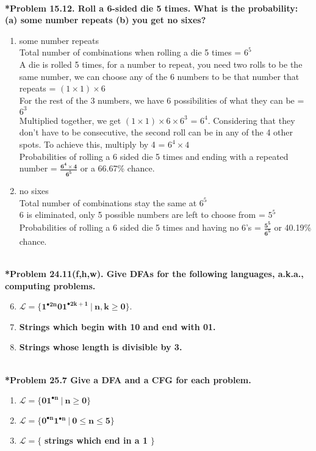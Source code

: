 \documentclass{article}
\begin{document}
    \noindent\\[0.25in]
    \noindent\textbf{*Problem 15.12. Roll a 6-sided die 5 times. What is the probability: (a) some number repeats (b) you get no sixes?}
    \begin{enumerate}[label=(\alph*)]
        \item some number repeats
        \\ Total number of combinations when rolling a die 5 times = $6^5$
        \\ A die is rolled 5 times, for a number to repeat, you need two rolls to be the same number, we can choose any of the 6 numbers to be that number that repeats = $(1\times1)\times6$
        \\ For the rest of the 3 numbers, we have 6 possibilities of what they can be = $6^3$
        \\ Multiplied together, we get $(1\times1)\times6\times6^3$ = $6^4$. Considering that they don't have to be consecutive, the second roll can be in any of the 4 other spots. To achieve this, multiply by 4 = $6^4 \times 4$
        \\ Probabilities of rolling a 6 sided die 5 times and ending with a repeated number = {\LARGE $\boxed{\mathbf{\frac{6^4 \times 4}{6^5}}}$} or a 66.67\% chance.
        \item no sixes
        \\ Total number of combinations stay the same at $6^5$
        \\ 6 is eliminated, only 5 possible numbers are left to choose from = $5^5$
        \\ Probabilities of rolling a 6 sided die 5 times and having no 6's = {\LARGE $\boxed{\mathbf{\frac{5^5}{6^5}}}$} or 40.19\% chance.
    \end{enumerate}

    \noindent\\[0.25in]
    \noindent\textbf{*Problem 24.11(f,h,w). Give DFAs for the following languages, a.k.a., computing problems.}
    \begin{enumerate}[label=(\alph*)]
        \setcounter{enumi}{5}
        \item $\mathbf{\mathcal{L}=\{1^{\bullet 2n}01^{\bullet 2k+1}\ |\ n,k\ge 0\}}$.
        \setcounter{enumi}{7}
        \item \textbf{Strings which begin with 10 and end with 01.}
        \setcounter{enumi}{22}
        \item \textbf{Strings whose length is divisible by 3.}
    \end{enumerate}

    \noindent\\[0.25in]
    \noindent\textbf{*Problem 25.7 Give a DFA and a CFG for each problem.}
    \begin{enumerate}[label=(\alph*)]
        \item $\mathbf{\mathcal{L}=\{01^{\bullet n}\ |\ n\ge 0\}}$
        \item $\mathbf{\mathcal{L}=\{0^{\bullet n}1^{\bullet n}\ |\ 0\le n\le 5\}}$
        \item $\mathbf{\mathcal{L}=\{}$ \textbf{strings which end in a 1} $\mathbf{\}}$
    \end{enumerate}
\end{document}
